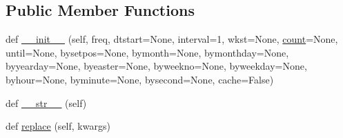 \subsection*{Public Member Functions}
\begin{DoxyCompactItemize}
\item 
def \hyperlink{classdateutil_1_1rrule_1_1rrule_a03614b36ee6327ab5a4bb8d736059bb8}{\+\_\+\+\_\+init\+\_\+\+\_\+} (self, freq, dtstart=None, interval=1, wkst=None, \hyperlink{classdateutil_1_1rrule_1_1rrulebase_ac37491765633ca2bdd968b0d0c763be7}{count}=None, until=None, bysetpos=None, bymonth=None, bymonthday=None, byyearday=None, byeaster=None, byweekno=None, byweekday=None, byhour=None, byminute=None, bysecond=None, cache=False)
\item 
def \hyperlink{classdateutil_1_1rrule_1_1rrule_ae77f51669e2848e0260e3d8a88bfa0e4}{\+\_\+\+\_\+str\+\_\+\+\_\+} (self)
\item 
def \hyperlink{classdateutil_1_1rrule_1_1rrule_af880b2b4a2287910e2488f8690f65268}{replace} (self, kwargs)
\end{DoxyCompactItemize}


